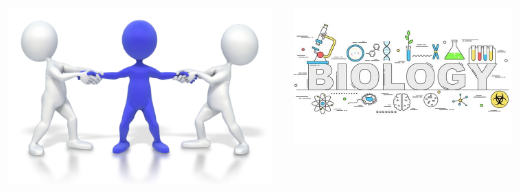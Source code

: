\documentclass[10pt]{beamer}
\begin{document}
\begin{frame}[t]
\begin{columns}
		\begin{column}{0.33\textwidth}
			\begin{center}
				\includegraphics[width=1.0\textwidth]{figures/pulled.png}
			\end{center}
		\end{column}
		
		\begin{column}{0.33\textwidth}
			\begin{center}
				\includegraphics[width=1.0\textwidth]{figures/biology2.jpg}
			\end{center}
		\end{column}
	\end{columns}
\end{frame}
\end{document}
